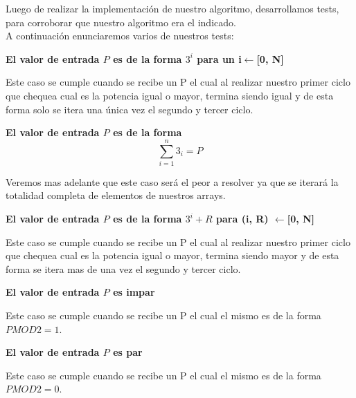 \indent Luego de realizar la implementaci\'on de nuestro algoritmo, desarrollamos tests,
para corroborar que nuestro algoritmo era el indicado.\\

A continuaci\'on enunciaremos varios de nuestros tests:\\

\begin{center}
 \textbf{El valor de entrada $P$ es de la forma ${3^i}$ para un i$\gets$[0, N] }
\end{center}
 Este caso se cumple cuando se recibe un P el cual al realizar nuestro primer ciclo que chequea cual es la potencia igual o mayor, termina siendo igual y de esta forma solo se itera una \'unica vez el segundo y tercer ciclo.
 
\begin{center}
 \textbf{El valor de entrada $P$ es de la forma \[
\sum_{i=1}^{n}3_{i}=P 
\]}
\end{center}

Veremos mas adelante que este caso ser\'a el peor a resolver ya que se iterar\'a la totalidad completa de elementos de nuestros arrays.
 
 

\begin{center}
 \textbf{El valor de entrada $P$ es de la forma ${3^i} + R$ para  (i, R) $\gets$[0, N]}
\end{center}

 Este caso se cumple cuando se recibe un P el cual al realizar nuestro primer ciclo que chequea cual es la potencia igual o mayor, termina siendo mayor y de esta forma se itera mas de una vez el segundo y tercer ciclo.

\begin{center}
 \textbf{El valor de entrada $P$ es impar}
\end{center}

 Este caso se cumple cuando se recibe un P el cual el mismo es de la forma $P MOD 2 = 1$.
 
 \begin{center}
 \textbf{El valor de entrada $P$ es par}
\end{center}

 Este caso se cumple cuando se recibe un P el cual el mismo es de la forma $P MOD 2 = 0$.